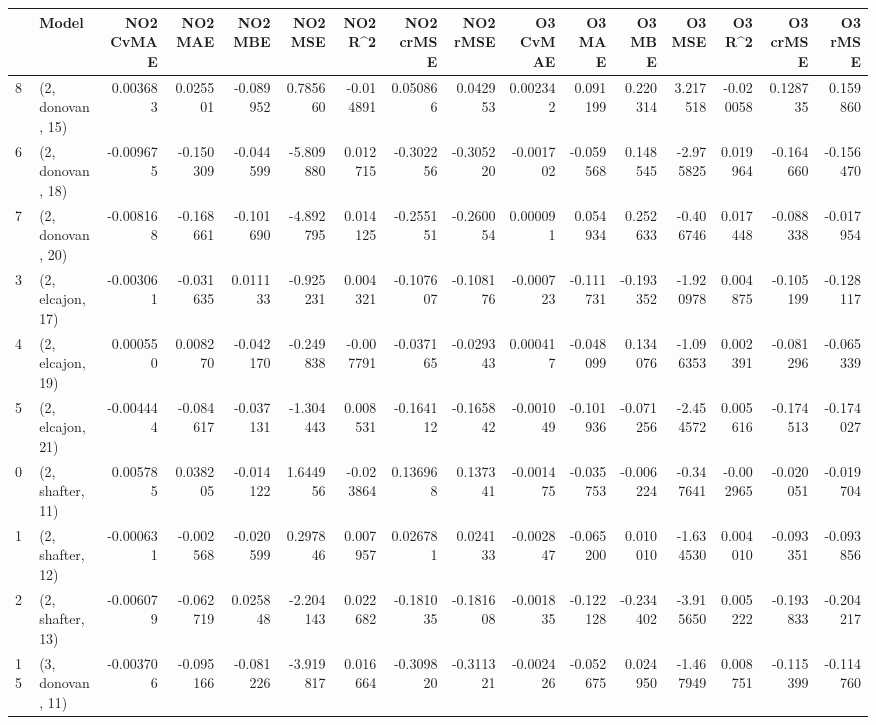 \begin{tabular}{llrrrrrrrrrrrrrr}
\toprule
{} &             Model &  NO2 CvMAE &   NO2 MAE &   NO2 MBE &    NO2 MSE &   NO2 R\textasciicircum2 &  NO2 crMSE &  NO2 rMSE &  O3 CvMAE &    O3 MAE &    O3 MBE &     O3 MSE &    O3 R\textasciicircum2 &  O3 crMSE &   O3 rMSE \\
\midrule
8  &  (2, donovan, 15) &   0.003683 &  0.025501 & -0.089952 &   0.785660 & -0.014891 &   0.050866 &  0.042953 &  0.002342 &  0.091199 &  0.220314 &   3.217518 & -0.020058 &  0.128735 &  0.159860 \\
6  &  (2, donovan, 18) &  -0.009675 & -0.150309 & -0.044599 &  -5.809880 &  0.012715 &  -0.302256 & -0.305220 & -0.001702 & -0.059568 &  0.148545 &  -2.975825 &  0.019964 & -0.164660 & -0.156470 \\
7  &  (2, donovan, 20) &  -0.008168 & -0.168661 & -0.101690 &  -4.892795 &  0.014125 &  -0.255151 & -0.260054 &  0.000091 &  0.054934 &  0.252633 &  -0.406746 &  0.017448 & -0.088338 & -0.017954 \\
3  &  (2, elcajon, 17) &  -0.003061 & -0.031635 &  0.011133 &  -0.925231 &  0.004321 &  -0.107607 & -0.108176 & -0.000723 & -0.111731 & -0.193352 &  -1.920978 &  0.004875 & -0.105199 & -0.128117 \\
4  &  (2, elcajon, 19) &   0.000550 &  0.008270 & -0.042170 &  -0.249838 & -0.007791 &  -0.037165 & -0.029343 &  0.000417 & -0.048099 &  0.134076 &  -1.096353 &  0.002391 & -0.081296 & -0.065339 \\
5  &  (2, elcajon, 21) &  -0.004444 & -0.084617 & -0.037131 &  -1.304443 &  0.008531 &  -0.164112 & -0.165842 & -0.001049 & -0.101936 & -0.071256 &  -2.454572 &  0.005616 & -0.174513 & -0.174027 \\
0  &  (2, shafter, 11) &   0.005785 &  0.038205 & -0.014122 &   1.644956 & -0.023864 &   0.136968 &  0.137341 & -0.001475 & -0.035753 & -0.006224 &  -0.347641 & -0.002965 & -0.020051 & -0.019704 \\
1  &  (2, shafter, 12) &  -0.000631 & -0.002568 & -0.020599 &   0.297846 &  0.007957 &   0.026781 &  0.024133 & -0.002847 & -0.065200 &  0.010010 &  -1.634530 &  0.004010 & -0.093351 & -0.093856 \\
2  &  (2, shafter, 13) &  -0.006079 & -0.062719 &  0.025848 &  -2.204143 &  0.022682 &  -0.181035 & -0.181608 & -0.001835 & -0.122128 & -0.234402 &  -3.915650 &  0.005222 & -0.193833 & -0.204217 \\
15 &  (3, donovan, 11) &  -0.003706 & -0.095166 & -0.081226 &  -3.919817 &  0.016664 &  -0.309820 & -0.311321 & -0.002426 & -0.052675 &  0.024950 &  -1.467949 &  0.008751 & -0.115399 & -0.114760 \\

\end{tabular}
